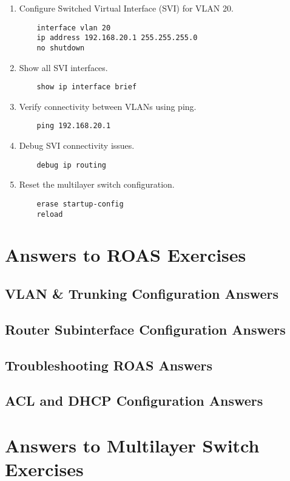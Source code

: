 \documentclass[a4paper]{book}
\begin{document}
\begin{enumerate}
    \item Configure Switched Virtual Interface (SVI) for VLAN 20.
    \begin{lstlisting}
    interface vlan 20
    ip address 192.168.20.1 255.255.255.0
    no shutdown
    \end{lstlisting}

    \item Show all SVI interfaces.
    \begin{lstlisting}
    show ip interface brief
    \end{lstlisting}

    \item Verify connectivity between VLANs using ping.
    \begin{lstlisting}
    ping 192.168.20.1
    \end{lstlisting}

    \item Debug SVI connectivity issues.
    \begin{lstlisting}
    debug ip routing
    \end{lstlisting}

    \item Reset the multilayer switch configuration.
    \begin{lstlisting}
    erase startup-config
    reload
    \end{lstlisting}
\end{enumerate}
\chapter{Answers to ROAS Exercises}
\section{VLAN \& Trunking Configuration Answers}
\section{Router Subinterface Configuration Answers}
\section{Troubleshooting ROAS Answers}
\section{ACL and DHCP Configuration Answers}

\chapter{Answers to Multilayer Switch Exercises}
\end{document}
